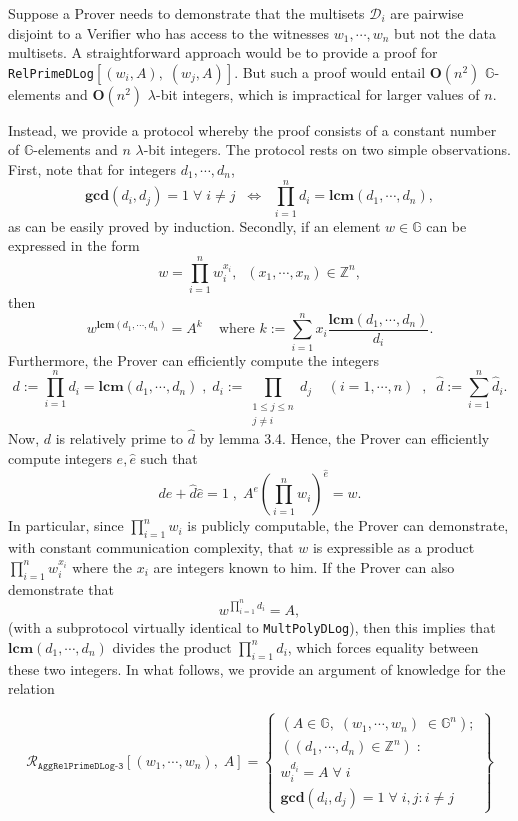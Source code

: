 \documentclass[11pt, lettersize, notitlepage, leqno, footskip=0.6cm]{article}
\newcommand{\bz}{\mathbb Z}
\newcommand{\pl}{\prod\limits}
\newcommand{\slim}{\sum\limits}
\newcommand{\ttt}{\texttt}
\newcommand{\LRA}{\Longleftrightarrow}
\newcommand{\mc}{\mathcal}
\newcommand{\mb}{\mathbb}
\newcommand{\mbf}{\mathbf}
\newcommand{\lam}{\lambda}
\newcommand{\what}{\widehat}
\newcommand{\vs}{\vspace{-0.15cm}}
\newcommand{\LCM}{\mbf{lcm}}
\newcommand{\GCD}{\mbf{gcd}}
\numberwithin{equation}{section}
\begin{document}
Suppose a Prover needs to demonstrate that the multisets $\mc{D}_i$ are pairwise disjoint to a Verifier who has access to the witnesses $w_1,\cdots,w_n$ but not the data multisets. A straightforward approach would be to provide a proof for \verb|RelPrimeDLog|$[(w_i, A),\;(w_j, A)]$. But such a proof would entail $\mbf{O}(n^2)$ $\mb{G}$-elements and $\mbf{O}(n^2)$ $\lam$-bit integers, which is impractical for larger values of $n$.

Instead, we provide a protocol whereby the proof consists of a constant number of $\mb{G}$-elements and $n$ $\lam$-bit integers. The protocol rests on two simple observations. First, note that for integers $d_1,\cdots,d_n$, \vs $$\GCD(d_i,d_j)=1\;\forall\;i\neq j\;\; \LRA\;\; \pl_{i=1}^n d_i= \LCM(d_1,\cdots,d_n),$$ as can be easily proved by induction. Secondly, if an element $w\in \mb{G}$ can be expressed in the form \vspace{-0.15cm}$$w = \prod\limits_{i=1}^n w_i^{x_i},\;\;(x_1,\cdots,x_n)\in\bz^n,$$ then \vs $$w^{\LCM(d_1,\cdots,d_n)} = A^{k} \;\;\;\text{ where } k := \slim_{i=1}^n x_i\frac{\LCM(d_1,\cdots,d_n)}{d_i}.$$ Furthermore, the Prover can efficiently compute the integers \vs $$d:= \pl_{i=1}^n d_i = \LCM(d_1,\cdots,d_n)\;,\;\what{d}_i:= \pl_{\substack{1\leq j\leq n\\ j\neq i}} d_j\;\;\;\; (i=1,\cdots,n)\;\;,\;\; \what{d} := \slim_{i=1}^n \what{d}_i.$$ Now, $d$ is relatively prime to $\what{d}$ by lemma 3.4. Hence, the Prover can efficiently compute integers $e,\what{e}$ such that $$de+\what{d}\what{e} = 1\;,\; A^e(\pl_{i=1}^n w_i)^{\what{e}} = w.  $$ In particular, since $\pl_{i=1}^n w_i$ is publicly computable, the Prover can demonstrate, with constant communication complexity, that $w$ is expressible as a product $\pl_{i=1}^n w_i^{x_i}$ where the $x_i$ are integers known to him. If the Prover can also demonstrate that $$w^{\prod\limits_{i=1}^n d_i} = A,$$ (with a subprotocol virtually identical to \verb|MultPolyDLog|), then this implies that $\LCM(d_1,\cdots,d_n)$ divides the product $\pl_{i=1}^n d_i$, which forces equality between these two integers. In what follows, we provide an argument of knowledge for the relation 

\[
  \mc{R}_{\ttt{AggRelPrimeDLog-3}}[(w_1,\cdots, w_n),\; A] = \left\{\begin{array}{l}
    (A\in\mb{G},\; (w_1,\cdots, w_n)\;\in\mb{G}^n);\\
    ((d_1,\cdots,d_n)\in\bz^n)\;: \\
    w_i^{d_i} = A\;\forall\;i\\
   	\GCD(d_i, d_j) = 1\;\forall \;i,j: i\neq j
  \end{array}\right\}
\] 
\end{document}
